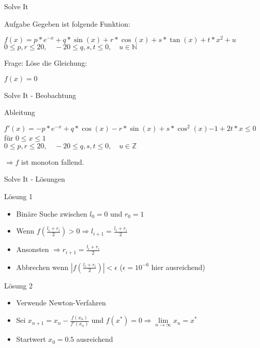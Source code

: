\begin{frame}[fragile]{Solve It}
	\begin{block}{Aufgabe}
		Gegeben ist folgende Funktion:
		\begin{center}
		$f(x) = p*e^{-x} + q*\sin(x) + r*\cos(x) + s*\tan(x) + t * x^2 + u $ 
		$0 \le p, r \le 20, \quad -20 \le q,s,t \le 0, \quad u \in \mathbb{N}$
		\end{center}
	\end{block}
	\begin{block}{Frage:}
		Löse die Gleichung:
		\begin{center}
		$f(x) = 0$ 
		\end{center}
	\end{block}
\end{frame}
\begin{frame}[fragile]{Solve It - Beobachtung}
	\begin{block}{Ableitung}
		\begin{center}
		$f'(x) = -p*e^{-x} + q*\cos(x) - r*\sin(x) + s*\cos^2(x){-1} + 2t * x \le 0$ \\ für $0 \le x \le 1$ \\
		$0 \le p, r \le 20, \quad -20 \le q,s,t \le 0, \quad u \in \mathbb{Z}$
		\end{center}
		\begin{center}
		$\Rightarrow f$ ist monoton fallend. 
		\end{center}
	\end{block}
\end{frame}

\begin{frame}[fragile]{Solve It - Lösungen}
	\begin{block}{Lösung 1}
		\begin{itemize}
			\item Binäre Suche zwischen $l_0 = 0$ und $r_0 = 1$
			\item Wenn $f(\frac{l_i+r_i}{2}) > 0 \Rightarrow l_{i+1} = \frac{l_i+r_i}{2}$ 
			\item Ansonsten $\Rightarrow r_{i+1} = \frac{l_i+r_i}{2}$
			\item Abbrechen wenn $|f(\frac{l_i+r_i}{2})| < \epsilon$ ($\epsilon = 10^{-6}$ hier ausreichend)
		\end{itemize}
	\end{block}

	\begin{block}{Lösung 2}
		\begin{itemize}
			\item Verwende Newton-Verfahren
			\item Sei $x_{n+1} = x_n - \frac{f(x_n)}{f'(x_n)}$ und $f(x^*) = 0 \Rightarrow \lim\limits_{n \to \infty} x_n = x^*$
			\item Startwert $x_0 = 0.5$ ausreichend
		\end{itemize}
	\end{block}
\end{frame}


